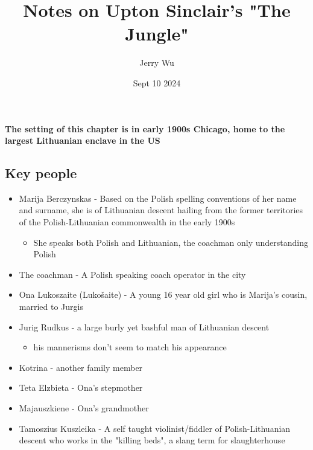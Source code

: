 \documentclass[12pt]{book}
\title{Notes on Upton Sinclair's "The Jungle"}
\author{Jerry Wu}
\date{Sept 10 2024}
\begin{document}
\maketitle

\tableofcontents

\chapter{}

\textbf{The setting of this chapter is in early 1900s Chicago, home to the largest Lithuanian enclave in the US}

\section*{Key people}
\begin{itemize}
    \item Marija Berczynskas - Based on the Polish spelling conventions of her name and surname, she is of Lithuanian descent hailing from the former territories of the Polish-Lithuanian commonwealth in the early 1900s
    \begin{itemize}
        \item She speaks both Polish and Lithuanian, the coachman only understanding Polish
    \end{itemize}
    \item The coachman - A Polish speaking coach operator in the city
    \item Ona Lukoszaite (Lukošaite) - A young 16 year old girl who is Marija's cousin, married to Jurgis
    \item Jurig Rudkus - a large burly yet bashful man of Lithuanian descent
    \begin{itemize}
        \item his mannerisms don't seem to match his appearance
    \end{itemize}
    \item Kotrina - another family member
    \item Teta Elzbieta - Ona's stepmother
    \item Majauszkiene - Ona's grandmother
    \item Tamoszius Kuszleika - A self taught violinist/fiddler of Polish-Lithuanian descent who works in the "killing beds", a slang term for slaughterhouse
\end{itemize}
\end{document}
